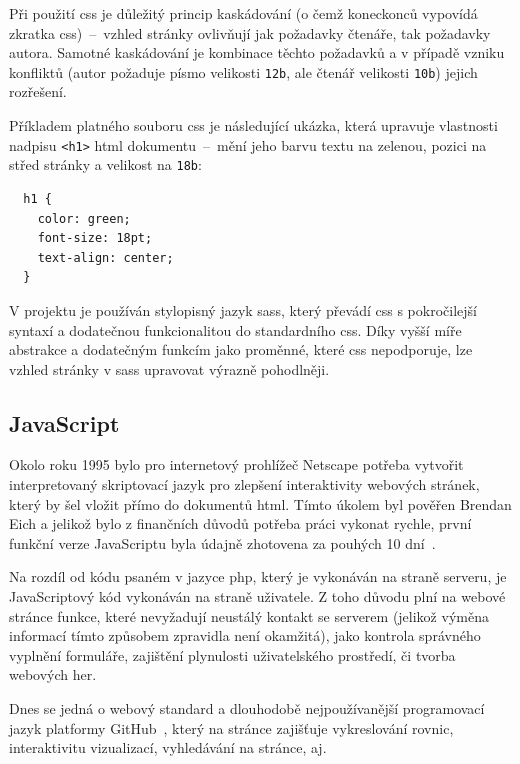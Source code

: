 \documentclass[a4paper, 12pt, twoside]{article}
\begin{document}
  Při použití \gls{css} je důležitý princip kaskádování (o čemž koneckonců vypovídá zkratka \gls{css})~--~vzhled stránky ovlivňují jak požadavky čtenáře, tak požadavky autora. Samotné kaskádování je kombinace těchto požadavků a v případě vzniku konfliktů (autor požaduje písmo velikosti \texttt{12b}, ale čtenář velikosti \texttt{10b}) jejich rozřešení.

  Příkladem platného souboru \gls{css} je následující ukázka, která upravuje vlastnosti nadpisu \texttt{<h1>} \gls{html} dokumentu~--~mění jeho barvu textu na zelenou, pozici na střed stránky a velikost na \texttt{18b}:

  \begin{verbatim}
  h1 {
    color: green;
    font-size: 18pt;
    text-align: center;
  }
  \end{verbatim}

  V projektu je používán stylopisný jazyk \gls{sass}, který převádí \gls{css} s pokročilejší syntaxí a dodatečnou funkcionalitou do standardního \gls{css}. Díky vyšší míře abstrakce a dodatečným funkcím jako proměnné, které \gls{css} nepodporuje, lze vzhled stránky v \gls{sass} upravovat výrazně pohodlněji.


  \subsection{JavaScript} \label{sec:JavaScript}
  Okolo roku 1995 bylo pro internetový prohlížeč Netscape potřeba vytvořit interpretovaný skriptovací jazyk pro zlepšení interaktivity webových stránek, který by šel vložit přímo do dokumentů \gls{html}. Tímto úkolem byl pověřen Brendan Eich a jelikož bylo z finančních důvodů potřeba práci vykonat rychle, první funkční verze JavaScriptu byla údajně zhotovena za pouhých 10 dní~\cite{the-origin-of-javascript}.

  Na rozdíl od kódu psaném v jazyce \gls{php}, který je vykonáván na straně serveru, je JavaScriptový kód vykonáván na straně uživatele. Z toho důvodu plní na webové stránce funkce, které nevyžadují neustálý kontakt se serverem (jelikož výměna informací tímto způsobem zpravidla není okamžitá), jako kontrola správného vyplnění formuláře, zajištění plynulosti uživatelského prostředí, či tvorba webových her.

  Dnes se jedná o webový standard a dlouhodobě nejpoužívanější programovací jazyk platformy GitHub~\cite{github-statistics}, který na stránce zajišťuje vykreslování rovnic, interaktivitu vizualizací, vyhledávání na stránce, aj.
\end{document}
